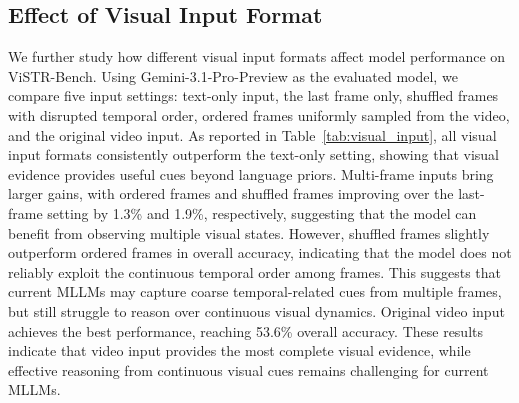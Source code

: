 \subsection{Effect of Visual Input Format}
\label{sec:visual_input}

We further study how different visual input formats affect model performance on ViSTR-Bench.
Using Gemini-3.1-Pro-Preview as the evaluated model, we compare five input settings: text-only input, the last frame only, shuffled frames with disrupted temporal order, ordered frames uniformly sampled from the video, and the original video input.
As reported in Table~\ref{tab:visual_input}, all visual input formats consistently outperform the text-only setting, showing that visual evidence provides useful cues beyond language priors.
Multi-frame inputs bring larger gains, with ordered frames and shuffled frames improving over the last-frame setting by 1.3\% and 1.9\%, respectively, suggesting that the model can benefit from observing multiple visual states.
However, shuffled frames slightly outperform ordered frames in overall accuracy, indicating that the model does not reliably exploit the continuous temporal order among frames.
This suggests that current MLLMs may capture coarse temporal-related cues from multiple frames, but still struggle to reason over continuous visual dynamics.
Original video input achieves the best performance, reaching 53.6\% overall accuracy.
These results indicate that video input provides the most complete visual evidence, while effective reasoning from continuous visual cues remains challenging for current MLLMs.
